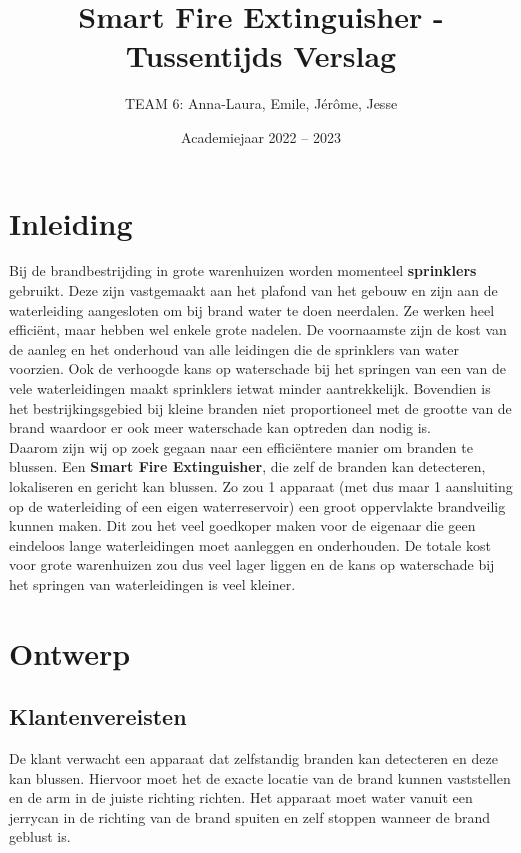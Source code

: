 \documentclass[kulak]{kulakarticle} %
\title{Smart Fire Extinguisher - Tussentijds Verslag}
\author{TEAM 6: Anna-Laura, Emile, Jérôme, Jesse}
\date{Academiejaar 2022 -- 2023}
\begin{document}
\maketitle



\section*{Inleiding}
                                          
Bij de brandbestrijding in grote warenhuizen worden momenteel \textbf{sprinklers} gebruikt. Deze zijn vastgemaakt aan het plafond van het gebouw en zijn aan de waterleiding aangesloten om bij brand water te doen neerdalen. Ze werken heel efficiënt, maar hebben wel enkele grote nadelen. De voornaamste zijn de kost van de aanleg en het onderhoud van alle leidingen die de sprinklers van water voorzien. Ook de verhoogde kans op waterschade bij het springen van een van de vele waterleidingen maakt sprinklers ietwat minder aantrekkelijk. Bovendien is het bestrijkingsgebied bij kleine branden niet proportioneel met de grootte van de brand waardoor er ook meer waterschade kan optreden dan nodig is. \\

Daarom zijn wij op zoek gegaan naar een efficiëntere manier om branden te blussen. Een \textbf{Smart Fire Extinguisher}, die zelf de branden kan detecteren, lokaliseren en gericht kan blussen. Zo zou 1 apparaat (met dus maar 1 aansluiting op de waterleiding of een eigen waterreservoir) een groot oppervlakte brandveilig kunnen maken. Dit zou het veel goedkoper maken voor de eigenaar die geen eindeloos lange waterleidingen moet aanleggen en onderhouden. De totale kost voor grote warenhuizen zou dus veel lager liggen en de kans op waterschade bij het springen van waterleidingen is veel kleiner.



\section{Ontwerp}
	\subsection{Klantenvereisten}

		De klant verwacht een apparaat dat zelfstandig branden kan detecteren en deze kan blussen. Hiervoor moet het de exacte locatie van de brand kunnen vaststellen en de arm in de juiste richting richten. Het apparaat moet water vanuit een jerrycan in de richting van de brand spuiten en zelf stoppen wanneer de brand geblust is. 
		
\end{document}
